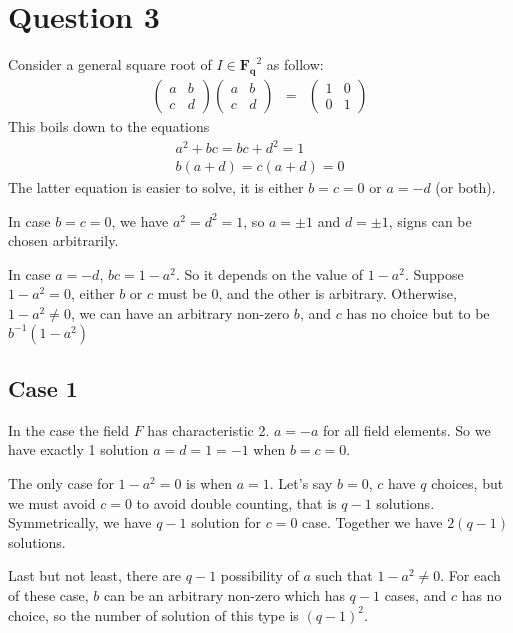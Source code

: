 \section*{Question 3}
Consider a general square root of $ I \in \mathbf{F_q}^2 $ as follow:
\begin{eqnarray*}
  \left(\begin{array}{cc}
    a & b \\ 
    c & d 
  \end{array}\right)\left(\begin{array}{cc}
    a & b \\ 
    c & d 
  \end{array}\right) &=& \left(\begin{array}{cc}
    1 & 0 \\ 
    0 & 1 
  \end{array}\right)
\end{eqnarray*}
This boils down to the equations
\begin{eqnarray*}
  a^2 + bc = bc + d^2 = 1 \\
  b(a + d) = c(a + d) = 0 
\end{eqnarray*}
The latter equation is easier to solve, it is either $ b = c = 0 $ or $ a = -d $ (or both).

In case $ b = c = 0 $, we have $ a^2 = d^2 = 1 $, so $ a = \pm 1 $ and $ d = \pm 1 $, signs can be chosen arbitrarily.

In case $ a = -d $, $ bc = 1- a^2 $. So it depends on the value of $ 1 - a^2 $. Suppose $ 1 - a^2 = 0 $, either $ b $ or $ c $ must be 0, and the other is arbitrary. Otherwise, $ 1 - a^2 \ne 0 $, we can have an arbitrary non-zero $ b $, and $ c $ has no choice but to be $ b^{-1} (1 - a^2)$

\subsection*{Case 1}
In the case the field $ F $ has characteristic 2. $ a = -a $ for all field elements. So we have exactly 1 solution $ a = d = 1 = -1 $ when $ b = c = 0 $.

The only case for $ 1 - a^2 = 0 $ is when $ a = 1 $. Let's say $ b = 0 $, $ c $ have $ q $ choices, but we must avoid $ c = 0 $ to avoid double counting, that is $ q - 1 $ solutions. Symmetrically, we have $ q - 1 $ solution for $ c = 0 $ case. Together we have $ 2(q - 1) $ solutions.

Last but not least, there are $ q - 1 $ possibility of $ a $ such that $ 1 - a^2 \ne 0 $. For each of these case, $ b $ can be an arbitrary non-zero which has $ q - 1 $ cases, and $ c $ has no choice, so the number of solution of this type is $ (q - 1)^2 $.

